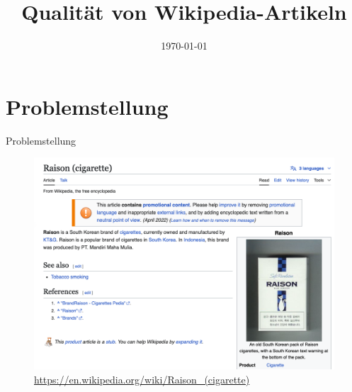 \documentclass[aspectratio=169]{beamer} %
\title{Qualit\"at von Wikipedia-Artikeln}
\institute{Artificial Intelligence Group,\\
University of Hagen, Germany}
\date{\today}
\begin{document}




\begin{frame}
    \titlepage
\end{frame}
\nologo

\section{Problemstellung}

\begin{frame}{Problemstellung}
    \begin{figure}
        \centering
        \includegraphics[width=0.6\linewidth]{figures/example_promo_article.png}
        \caption{\url{https://en.wikipedia.org/wiki/Raison\_(cigarette)}}
        \label{fig:enter-label}
    \end{figure}
\end{frame}
\end{document}
